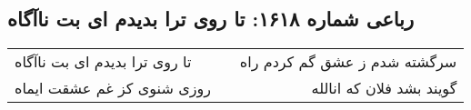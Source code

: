 \begin{center}
\section*{رباعی شماره ۱۶۱۸: تا روی ترا بدیدم ای بت ناآگاه}
\label{sec:1618}
\begin{longtable}{l p{0.5cm} r}
تا روی ترا بدیدم ای بت ناآگاه
&&
سرگشته شدم ز عشق گم کردم راه
\\
روزی شنوی کز غم عشقت ایماه
&&
گویند بشد فلان که انالله
\\
\end{longtable}
\end{center}
